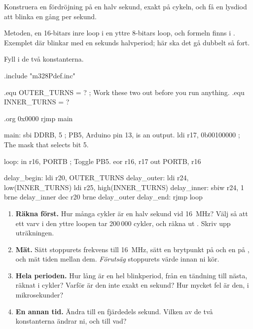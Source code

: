 \label{lab3:d20}
Konstruera en fördröjning på en halv sekund, exakt på cykeln, och få en lysdiod att blinka en gång
per sekund.

Metoden, en 16-bitars inre loop i en yttre 8-bitars loop, och formeln  finns i
. Exemplet där blinkar med en sekunds halvperiod; här ska det gå dubbelt så fort.

Fyll i de två konstanterna.

\begin{asmcode}
.include "m328Pdef.inc"

.equ OUTER_TURNS = ?                ; Work these two out before you run anything.
.equ INNER_TURNS = ?

.org 0x0000
    rjmp main

main:
    sbi DDRB, 5                     ; PB5, Arduino pin 13, is an output.
    ldi r17, 0b00100000             ; The mask that selects bit 5.

loop:
    in r16, PORTB                   ; Toggle PB5.
    eor r16, r17
    out PORTB, r16

delay_begin:
    ldi r20, OUTER_TURNS
delay_outer:
    ldi r24, low(INNER_TURNS)
    ldi r25, high(INNER_TURNS)
delay_inner:
    sbiw r24, 1
    brne delay_inner
    dec r20
    brne delay_outer
delay_end:
    rjmp loop
\end{asmcode}

\begin{enumerate}
  \item \textbf{Räkna först.} Hur många cykler är en halv sekund vid 16~MHz? Välj
     så att ett varv i den yttre loopen tar 200\,000 cykler, och räkna ut
    . Skriv upp uträkningen.
  \item \textbf{Mät.} Sätt stoppurets frekvens till 16~MHz, sätt en brytpunkt på
     och en på , och mät tiden mellan dem. \emph{Förutsäg}
    stoppurets värde innan ni kör.
  \item \textbf{Hela perioden.} Hur lång är en hel blinkperiod, från en tändning till nästa, räknat
    i cykler? Varför är den inte exakt en sekund? Hur mycket fel är den, i mikrosekunder?
  \item \textbf{En annan tid.} Ändra till en fjärdedels sekund. Vilken av de två konstanterna ändrar
    ni, och till vad?
\end{enumerate}

